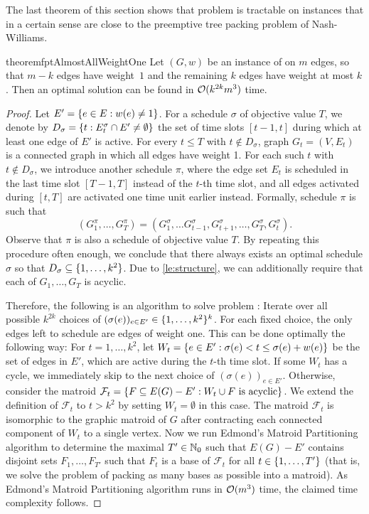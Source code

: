 The last theorem of this section shows that problem {\xxxNTP} is tractable on instances that in 
a certain sense are close to the preemptive tree packing problem of Nash-Williams. 
\begin{restatable}{theorem}{fptAlmostAllWeightOne}
\label{th:fpt_almost_all_weight_one}
Let $(G,w)$ be an instance of {\xxxNTP} on $m$ edges, so that $m-k$ edges have weight~$1$ and 
the remaining $k$ edges have weight at most $k$. 
Then an optimal solution can be found in $\mathcal{O}(k^{2k}m^3)$ time.
\end{restatable}
\begin{proof}
Let $E'=\{ e\in E: w(e)\ne1 \}$. 
For a schedule $\sigma$ of objective value $T$, we denote by $D_\sigma= \{ t: E_t^\sigma\cap E'\ne\emptyset \}$ 
the set of time slots $[t-1,t]$ during which at least one edge of $E'$ is active. 
For every $t\le T$ with $t\notin D_\sigma$, graph $G_t=(V,E_t)$ is a connected graph in which 
all edges have weight 1.  
For each such $t$ with $t \not\in D_\sigma$, we introduce another schedule $\pi$, where the edge set $E_t$ is scheduled in the last time 
slot $[T-1, T]$ instead of the $t$-th time slot, and all edges activated during $[t, T]$ are activated 
one time unit earlier instead. Formally, schedule $\pi$ is such that
\[(G^\pi_1,\dots, G^\pi_T) = (G^\sigma_1, \dots G^\sigma_{t-1}, G^\sigma_{t+1}, \dots, G^\sigma_T, G^\sigma_t). \]
Observe that $\pi$ is also a schedule of objective value $T$. 
By repeating this procedure often enough, we conclude that there always exists an optimal schedule $\sigma$ so that $D_\sigma \subseteq \{ 1, \ldots, k^2 \}$. 
Due to \cref{le:structure}, we can additionally require that each of $G_1, \dots, G_T$ is acyclic.

Therefore, the following is an algorithm to solve problem {\xxxNTP}: 
Iterate over all possible $k^{2k}$ choices of $(\sigma(e))_{e \in E'} \in \{ 1, \ldots, k^2 \}^k$. 
For each fixed choice, the only edges left to schedule are edges of weight one. 
This can be done optimally the following way: 
For $t = 1,\dots, k^2$, let $W_t = \{ e \in E' : \sigma(e) < t \leq \sigma(e) + w(e) \}$ be the set of edges in $E'$, which are active during the $t$-th time slot. 
If some $W_t$ has a cycle, we immediately skip to the next choice of $(\sigma(e))_{e \in E'}$. 
Otherwise, consider the matroid $\mathcal{F}_t = \{ F \subseteq E(G)-E' : W_t \cup F \text{ is acyclic} \}$. 
We extend the definition of $\mathcal{F}_t$ to $t > k^2$ by setting $W_t = \emptyset$ in this case. 
The matroid $\mathcal{F}_t$ is isomorphic to the graphic matroid of $G$ after contracting each connected 
component of $W_t$ to a single vertex. 
Now we run Edmond's Matroid Partitioning algorithm \cite{edmonds1965minimum} to determine the 
maximal $T'\in\mathbb{N}_0$ such that $E(G)-E'$ contains disjoint sets $F_1, \dots, F_{T'}$ such that $F_t$ 
is a base of $\mathcal{F}_t$ for all $t \in \{ 1, \ldots, T' \}$ (that is, we solve the problem of packing as 
many bases as possible into a matroid). 
As Edmond's Matroid Partitioning algorithm runs in $\mathcal{O}(m^3)$ time, the claimed time complexity follows.
\end{proof}


